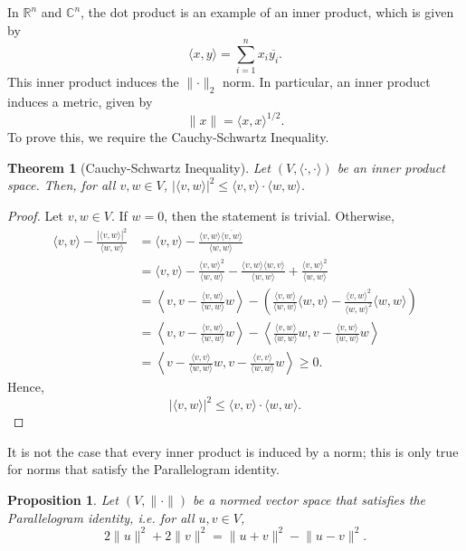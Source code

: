 \documentclass[a4paper, openany]{memoir}
\theoremstyle{definition}
\theoremstyle{plain}
\newtheorem{theorem}[definition]{Theorem}
\newtheorem{proposition}[definition]{Proposition}
\begin{document}
    In $\mathbb{R}^n$ and $\mathbb{C}^n$, the dot product is an example of an inner product, which is given by
    \[\langle x, y \rangle = \sum_{i=1}^n x_i \overline{y_i}.\]
    This inner product induces the $\lVert \cdot \rVert_2$ norm. In particular, an inner product induces a metric, given by
    \[\lVert x\rVert = \langle x, x \rangle^{1/2}.\]
    To prove this, we require the Cauchy-Schwartz Inequality.
    \begin{theorem}[Cauchy-Schwartz Inequality]
        Let $(V, \langle \cdot, \cdot \rangle)$ be an inner product space. Then, for all $v, w \in V$, $|\langle v, w \rangle|^2 \leq \langle v, v \rangle \cdot \langle w, w \rangle$.
    \end{theorem}
    \begin{proof}
        Let $v, w \in V$. If $w = 0$, then the statement is trivial. Otherwise,
        \begin{align*}
            \langle v, v \rangle - \frac{|\langle v, w\rangle|^2}{\langle w, w \rangle} &= \langle v, v \rangle - \frac{\langle v, w \rangle \overline{\langle v, w \rangle}}{\langle w, w \rangle} \\
            &= \langle v, v \rangle - \frac{\langle v, w \rangle^2}{\langle w, w \rangle} - \frac{\langle v, w \rangle \langle w, v \rangle}{\langle w, w \rangle} + \frac{\langle v, w \rangle^2}{\langle w, w \rangle} \\
            &= \left\langle v, v - \frac{\langle v, w \rangle}{\langle w, w \rangle} w \right\rangle - \left(\frac{\langle v, w \rangle}{\langle w, w \rangle} \langle w, v \rangle - \frac{\langle v, w \rangle^2}{\langle w, w \rangle^2} \langle w, w \rangle \right) \\
            &= \left\langle v, v - \frac{\langle v, w \rangle}{\langle w, w \rangle} w \right\rangle - \left\langle \frac{\langle v, w \rangle}{\langle w, w \rangle} w, v - \frac{\langle v, w \rangle}{\langle w, w \rangle} w \right\rangle \\
            &= \left\langle v - \frac{\langle v, v\rangle}{\langle w, w \rangle} w, v - \frac{\langle v, v\rangle}{\langle w, w \rangle} w \right\rangle \geq 0.
        \end{align*}
        Hence,
        \[|\langle v, w \rangle|^2 \leq \langle v, v \rangle \cdot \langle w, w \rangle.\]
    \end{proof}
    \noindent It is not the case that every inner product is induced by a norm; this is only true for norms that satisfy the Parallelogram identity.
    \begin{proposition}
        Let $(V, \lVert \cdot \rVert)$ be a normed vector space that satisfies the Parallelogram identity, i.e. for all $u, v \in V$,
        \[2\lVert u \rVert^2 + 2\lVert v \rVert^2 = \lVert u + v \rVert^2 - \lVert u - v \rVert^2.\]
    \end{proposition}
\end{document}
